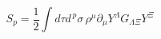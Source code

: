 \begin{equation}\label{13} 
S_p=\frac{1}{2}\int d\tau d^{\,p}\sigma\,\rho^\mu 
\partial_{\mu}Y^{\Lambda} G_{\Lambda\Xi}Y^{\Xi}
\end{equation} 

